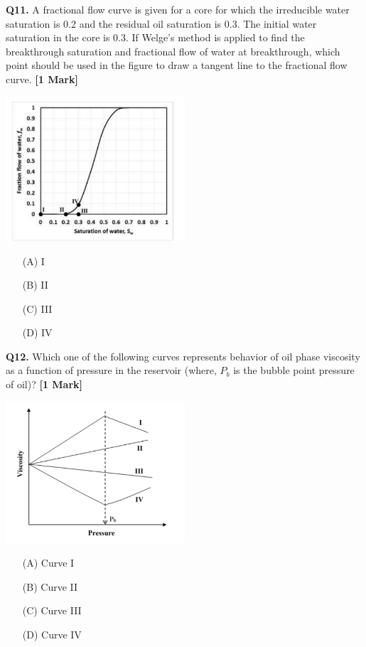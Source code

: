 \documentclass[11pt]{article}
\newcommand{\questiona}[2]{
    \noindent\textbf{Q#2.} #1 \hfill \textbf{[1 Mark]}
}
\begin{document}
\questiona{A fractional flow curve is given for a core for which the irreducible water saturation is 0.2 and the residual oil saturation is 0.3. The initial water saturation in the core is 0.3. If Welge’s method is applied to find the breakthrough saturation and fractional flow of water at breakthrough, which point should be used in the figure to draw a tangent line to the fractional flow curve.}{11}
\begin{center}
\includegraphics[width=0.5\textwidth]{figures/11.png}
\end{center}
\begin{enumerate}
    \item[(A)] I  
    \item[(B)] II  
    \item[(C)] III  
    \item[(D)] IV  
\end{enumerate}
\vspace{0.5cm}

\questiona{Which one of the following curves represents behavior of oil phase viscosity as a function of pressure in the reservoir (where, \( P_b \) is the bubble point pressure of oil)?}{12}
\begin{center}
\includegraphics[width=0.5\textwidth]{figures/12.png}
\end{center}
\begin{enumerate}
    \item[(A)] Curve I  
    \item[(B)] Curve II  
    \item[(C)] Curve III  
    \item[(D)] Curve IV  
\end{enumerate}
\vspace{0.5cm}
\end{document}
